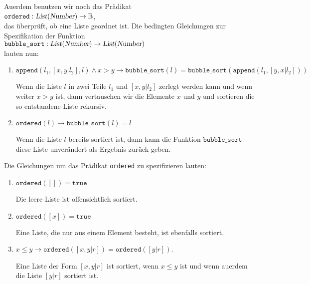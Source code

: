 Au\3erdem benutzen wir noch das Pr\"{a}dikat \\[0.1cm]
\hspace*{1.3cm} 
$\texttt{ordered}: \textsl{List}(\textsl{Number}) \rightarrow \mathbb{B}$, \\[0.1cm]
das \"{u}berpr\"{u}ft, ob eine Liste geordnet ist.
Die bedingten Gleichungen
zur Spezifikation der Funktion \\[0.1cm]
\hspace*{1.3cm} 
$\texttt{bubble\_sort}: \textsl{List}(\textsl{Number}) \rightarrow \textsl{List}(\textsl{Number})$
\\[0.1cm]
lauten nun:
\begin{enumerate}
\item $\mathtt{append}(l_1, [x,y|l_2], l) \wedge x > y \rightarrow \mathtt{bubble\_sort}(l) = \mathtt{bubble\_sort}(\mathtt{append}(l_1, [y,x|l_2]))$

      Wenn die Liste $l$ in zwei Teile $l_1$ und $[x,y|l_2]$ zerlegt werden kann
      und wenn weiter $x>y$ ist, dann vertauschen wir die Elemente $x$ und $y$
      und sortieren die so entstandene Liste rekursiv.
\item $\mathtt{ordered}(l) \rightarrow \mathtt{bubble\_sort}(l) = l$

      Wenn die Liste $l$ bereits sortiert ist, dann kann die Funktion
      $\mathtt{bubble\_sort}$ diese Liste unver\"{a}ndert als Ergebnis zur\"{u}ck geben.
\end{enumerate}
Die Gleichungen um das Pr\"{a}dikat \texttt{ordered} zu spezifizieren lauten:
\begin{enumerate}
\item $\mathtt{ordered}([]) = \mathtt{true}$

      Die leere Liste ist offensichtlich sortiert.
\item $\mathtt{ordered}([x]) = \mathtt{true}$

      Eine Liste, die nur aus einem Element besteht, ist ebenfalls sortiert.
\item $x \leq y \rightarrow \mathtt{ordered}([x,y|r]) = \mathtt{ordered}([y|r])$.

      Eine Liste der Form $[x,y|r]$ ist sortiert, wenn $x \leq y$ ist und
      wenn au\3erdem die Liste $[y|r]$ sortiert ist.
\end{enumerate}

